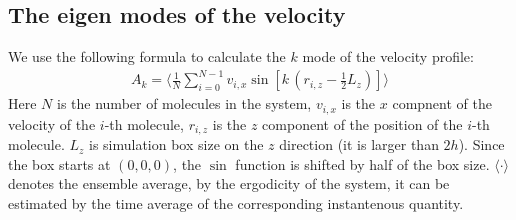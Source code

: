 \documentclass[aip,jcp,a4paper,reprint,onecolumn]{revtex4-1}
\begin{document}
\subsection{The eigen modes of the velocity}

We use the following formula to calculate the $k$ mode of the velocity profile:
\begin{align}
  A_k =\bigg\langle \frac 1N \sum_{i=0}^{N-1} v_{i, x} \sin[k\, (r_{i,z} - \frac12 L_z)]\bigg\rangle
\end{align}
Here $N$ is the number of molecules in the system, $v_{i, x}$ is the
$x$ compnent of the velocity of the $i$-th molecule, $r_{i,z}$ is the
$z$ component of the position of the $i$-th molecule. $L_z$ is
simulation box size on the $z$ direction (it is larger than
$2h$). Since the box starts at $(0,0,0)$, the $\sin$ function is
shifted by half of the box size. $\langle\cdot\rangle$ denotes the
ensemble average, by the ergodicity of the system, it can be estimated
by the time average of the corresponding instantenous quantity.
\end{document}
